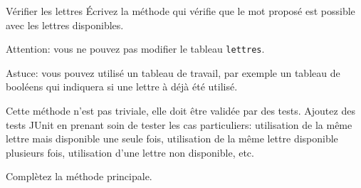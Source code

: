 \documentclass[a4paper,11pt]{article}
\begin{document}
 	\begin{Exercice}{Vérifier les lettres}
 			\'Ecrivez la méthode 
		qui vérifie que le mot proposé est possible avec les lettres 
		disponibles. 
		
		Attention: vous ne pouvez pas modifier le tableau \texttt{lettres}.
		
		Astuce: vous pouvez utilisé un tableau de travail, par exemple un 
		tableau de booléens qui indiquera si une lettre à déjà été utilisé.
		
		Cette méthode n'est pas triviale, elle doit être validée par des tests.
		Ajoutez des tests JUnit en prenant soin de tester les cas particuliers: 
		utilisation de la même lettre mais disponible une seule fois, utilisation de la 
		même lettre disponible plusieurs fois, utilisation d'une lettre non 
		disponible, etc.
		
		Complètez la méthode principale.
	\end{Exercice} 
	
\end{document}
